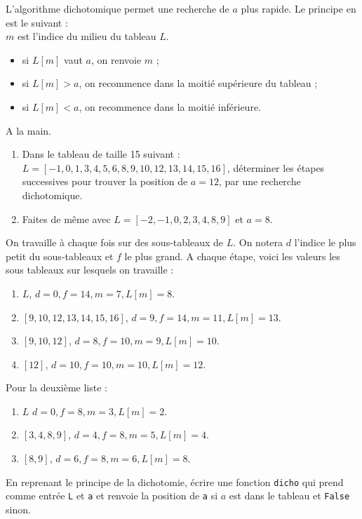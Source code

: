 L'algorithme dichotomique permet une recherche de $a$ plus rapide. Le principe en est le suivant :\\
$m$ est l'indice du milieu du tableau $L$.
\begin{itemize}
\item si $L[m]$ vaut $a$, on renvoie $m$ ;
\item si $L[m]>a$, on recommence dans la moitié supérieure du tableau ;
\item si $L[m]<a$, on recommence dans la moitié inférieure.
\end{itemize}


\begin{exercice}A la main.
\begin{enumerate}
\item Dans le tableau de taille 15 suivant : $L=[-1,0,1,3,4,5,6,8,9,10,12,13,14,15,16]$, déterminer les étapes successives pour trouver la position de $a=12$, par une recherche dichotomique.
\item Faites de même avec $L=[-2,-1,0,2,3,4,8,9]$ et $a=8$.
\end{enumerate}
\end{exercice}

\begin{solution}
On travaille à chaque fois sur des sous-tableaux de $L$. On notera $d$ l'indice le plus petit du sous-tableaux et $f$ le plus grand. A chaque étape, voici les valeurs les sous tableaux sur lesquels on travaille :
\begin{enumerate}
\item $L$, $d=0,f=14,m=7,L[m]=8$.
\item $[9,10,12,13,14,15,16]$, $d=9,f=14,m=11,L[m]=13$.
\item $[9,10,12]$, $d=8,f=10,m=9,L[m]=10$.
\item $[12]$, $d=10,f=10,m=10,L[m]=12$.
\end{enumerate}
Pour la deuxième liste : 
\begin{enumerate}
\item $L$ $d=0,f=8,m=3,L[m]=2$.
\item $[3,4,8,9]$, $d=4,f=8,m=5,L[m]=4$.
\item $[8,9]$, $d=6,f=8,m=6,L[m]=8$.
\end{enumerate}
\end{solution}


\begin{exercice}
En reprenant le principe de la dichotomie, écrire une fonction \verb?dicho? qui prend comme entrée \verb?L? et \verb?a? et renvoie la position de \verb?a? si $a$ est dans le tableau et \verb?False? sinon.
\end{exercice}

